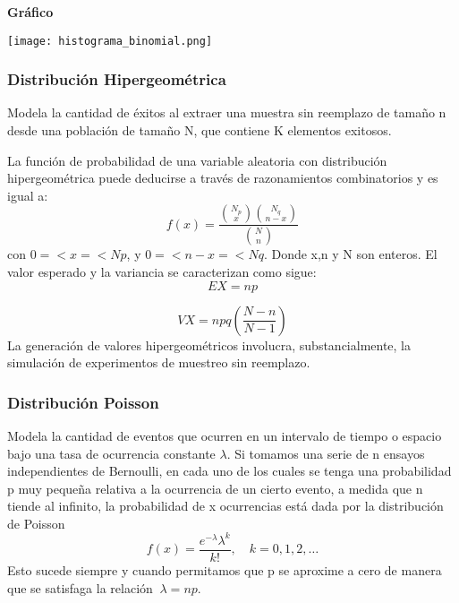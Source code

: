 \documentclass[11pt]{article}
\begin{document}
\noindent\textbf{Gráfico\newline}
\begin{center}
\texttt{[image: histograma\_binomial.png]}
\end{center}

\subsubsection{Distribución Hipergeométrica}
Modela la cantidad de éxitos al extraer una muestra sin reemplazo de tamaño n desde una población de tamaño N, que contiene K elementos exitosos.

La función de probabilidad de una variable aleatoria con distribución hipergeométrica puede deducirse a través de razonamientos combinatorios y es igual a:
\begin{equation}
    f(x) = \frac{\binom{N_{p}}{x}\binom{N_{q}}{n-x}}{\binom{N}{n}}
    \end{equation}
  con $0 =< x =< Np$, y $0 =< n-x =<Nq$. Donde x,n y N son enteros. El valor esperado y la variancia se caracterizan como sigue:
  \begin{equation}
    EX = np
    \end{equation}

  \begin{equation}
    VX = npq(\frac{N-n}{N-1})
    \end{equation}
  La generación de valores hipergeométricos involucra, substancialmente, la simulación de experimentos de muestreo sin reemplazo.


\subsubsection{Distribución Poisson}
Modela la cantidad de eventos que ocurren en un intervalo de tiempo o espacio bajo una tasa de ocurrencia constante \( \lambda \).
 Si tomamos una serie de n ensayos independientes de Bernoulli, en cada uno de los cuales se tenga una probabilidad p muy pequeña relativa a la ocurrencia de un cierto evento,
  a medida que n tiende al infinito, la probabilidad de x ocurrencias está dada por la distribución de Poisson
  \begin{equation}
    f(x) = \frac{e^{-\lambda} \lambda^k}{k!}, \quad k = 0, 1, 2, \ldots
    \end{equation}
Esto sucede siempre y cuando permitamos que p se aproxime a cero de manera que se satisfaga la relación \(\ \lambda = np. \)\
\end{document}
